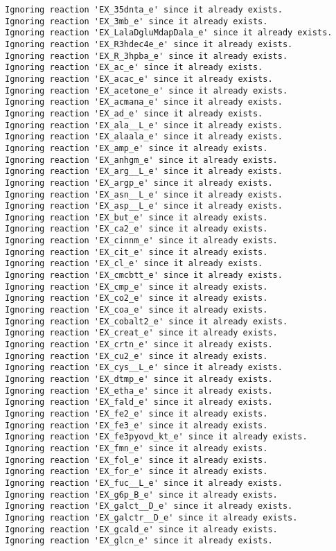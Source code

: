 \documentclass[
  letterpaper,
  DIV=11,
  numbers=noendperiod]{scrartcl}
\begin{document}
\begin{verbatim}
Ignoring reaction 'EX_35dnta_e' since it already exists.
Ignoring reaction 'EX_3mb_e' since it already exists.
Ignoring reaction 'EX_LalaDgluMdapDala_e' since it already exists.
Ignoring reaction 'EX_R3hdec4e_e' since it already exists.
Ignoring reaction 'EX_R_3hpba_e' since it already exists.
Ignoring reaction 'EX_ac_e' since it already exists.
Ignoring reaction 'EX_acac_e' since it already exists.
Ignoring reaction 'EX_acetone_e' since it already exists.
Ignoring reaction 'EX_acmana_e' since it already exists.
Ignoring reaction 'EX_ad_e' since it already exists.
Ignoring reaction 'EX_ala__L_e' since it already exists.
Ignoring reaction 'EX_alaala_e' since it already exists.
Ignoring reaction 'EX_amp_e' since it already exists.
Ignoring reaction 'EX_anhgm_e' since it already exists.
Ignoring reaction 'EX_arg__L_e' since it already exists.
Ignoring reaction 'EX_argp_e' since it already exists.
Ignoring reaction 'EX_asn__L_e' since it already exists.
Ignoring reaction 'EX_asp__L_e' since it already exists.
Ignoring reaction 'EX_but_e' since it already exists.
Ignoring reaction 'EX_ca2_e' since it already exists.
Ignoring reaction 'EX_cinnm_e' since it already exists.
Ignoring reaction 'EX_cit_e' since it already exists.
Ignoring reaction 'EX_cl_e' since it already exists.
Ignoring reaction 'EX_cmcbtt_e' since it already exists.
Ignoring reaction 'EX_cmp_e' since it already exists.
Ignoring reaction 'EX_co2_e' since it already exists.
Ignoring reaction 'EX_coa_e' since it already exists.
Ignoring reaction 'EX_cobalt2_e' since it already exists.
Ignoring reaction 'EX_creat_e' since it already exists.
Ignoring reaction 'EX_crtn_e' since it already exists.
Ignoring reaction 'EX_cu2_e' since it already exists.
Ignoring reaction 'EX_cys__L_e' since it already exists.
Ignoring reaction 'EX_dtmp_e' since it already exists.
Ignoring reaction 'EX_etha_e' since it already exists.
Ignoring reaction 'EX_fald_e' since it already exists.
Ignoring reaction 'EX_fe2_e' since it already exists.
Ignoring reaction 'EX_fe3_e' since it already exists.
Ignoring reaction 'EX_fe3pyovd_kt_e' since it already exists.
Ignoring reaction 'EX_fmn_e' since it already exists.
Ignoring reaction 'EX_fol_e' since it already exists.
Ignoring reaction 'EX_for_e' since it already exists.
Ignoring reaction 'EX_fuc__L_e' since it already exists.
Ignoring reaction 'EX_g6p_B_e' since it already exists.
Ignoring reaction 'EX_galct__D_e' since it already exists.
Ignoring reaction 'EX_galctr__D_e' since it already exists.
Ignoring reaction 'EX_gcald_e' since it already exists.
Ignoring reaction 'EX_glcn_e' since it already exists.

\end{verbatim}
\end{document}
